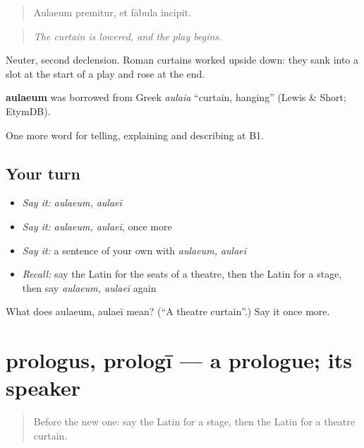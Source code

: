 \begin{quote}
Aulaeum premitur, et fābula incipit.
\end{quote}

\begin{quote}
\emph{The curtain is lowered, and the play begins.}
\end{quote}

Neuter, second declension. Roman curtains worked upside down: they sank into a slot at the start of a play and rose at the end.

\begin{cousinweb}
\textbf{aulaeum} was borrowed from Greek \emph{aulaia} \textquotedblleft{}curtain, hanging\textquotedblright{} (Lewis \& Short; EtymDB).
\end{cousinweb}

\begin{grammarlens}[title={What you've built}]
One more word for telling, explaining and describing at B1.
\end{grammarlens}

\subsection*{Your turn}
\begin{itemize}
\raggedright
  \item \emph{Say it:} \emph{aulaeum, aulaeī}
  \item \emph{Say it:} \emph{aulaeum, aulaeī}, once more
  \item \emph{Say it:} a sentence of your own with \emph{aulaeum, aulaeī}
  \item \emph{Recall:} say the Latin for the seats of a theatre, then the Latin for a stage, then say \emph{aulaeum, aulaeī} again
\end{itemize}

\begin{tcolorbox}[breakable,colback=teal!4,colframe=teal!35!black,title={Before you move on}]
What does aulaeum, aulaeī mean? (\textquotedblleft{}A theatre curtain\textquotedblright{}.) Say it once more.
\end{tcolorbox}
\section[prologus, prologī]{prologus, prologī — a prologue; its speaker}

\label{lesson:LA-C546-prologus}



\begin{quote}
Before the new one: say the Latin for a stage, then the Latin for a theatre curtain.
\end{quote}

